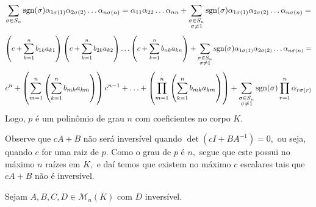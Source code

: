 \documentclass[11pt,a4paper]{article}
\begin{document}
{\[\]
\[
\sum\limits_{\sigma \in S_n} {\rm sgn}(\sigma) \alpha_{1\sigma(1)}\alpha_{2\sigma(2)} \ldots \alpha_{n \sigma(n)} = \alpha_{11}\alpha_{22} \ldots \alpha_{nn} + \sum\limits_{\substack{\sigma \in S_n \\ \sigma \neq 1}} {\rm sgn}(\sigma) \alpha_{1\sigma(1)}\alpha_{2\sigma(2)} \ldots \alpha_{n \sigma(n)} =
\]
\[
\left( c + \sum\limits_{k = 1}^n b_{1k}a_{k1} \right)\left( c + \sum\limits_{k = 1}^n b_{2k}a_{k2} \right)\ldots\left( c + \sum\limits_{k = 1}^n b_{nk}a_{kn} \right) + \sum\limits_{\substack{\sigma \in S_n \\ \sigma \neq 1}} {\rm sgn}(\sigma) \alpha_{1\sigma(1)}\alpha_{2\sigma(2)} \ldots \alpha_{n \sigma(n)} = \]\[c^n + \left(  \sum\limits_{m = 1}^n  \left(\sum\limits_{k = 1}^n b_{mk}a_{km}\right) \right)c^{n-1} + \ldots +  \left(  \prod\limits_{m = 1}^n  \left(\sum\limits_{k = 1}^n b_{mk}a_{km}\right)\right) + \sum\limits_{\substack{\sigma \in S_n \\ \sigma \neq 1}} {\rm sgn}(\sigma) \prod\limits_{r = 1}^n \alpha_{r\sigma(r)}
\]
Logo, $p$ é um polinômio de grau $n$ com coeficientes no corpo $K.$ 

Observe que $cA + B$ não será inversível quando $\det(cI + BA^{-1}) = 0,$ ou seja, quando $c$ for uma raiz de $p.$ Como o grau de $p$ é $n,$ segue que este possui no máximo $n$ raízes em $K,$ e daí temos que existem no máximo $c$ escalares tais que $cA + B$ não é inversível.
}

 Sejam $A, B, C, D\in \mathcal{M}_n(K)$ com $D$ inversível.

\end{document}
